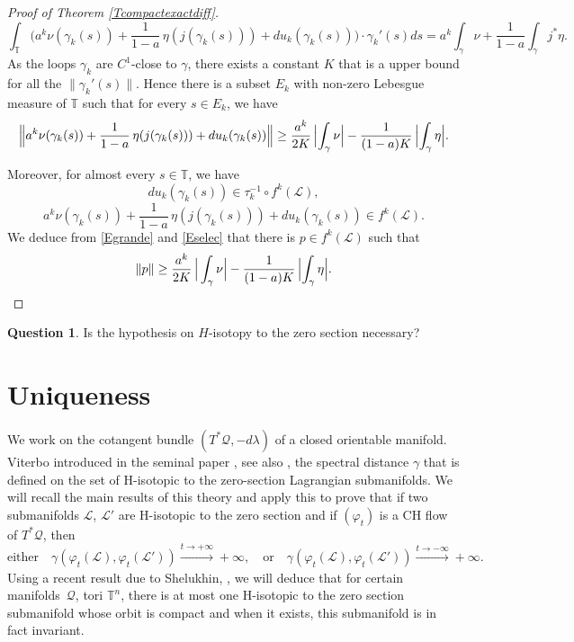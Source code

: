 \documentclass[JEP,XML,SOM,Unicode,published]{cedram}
\theoremstyle{definition}
\newtheorem*{question*}{Question}
\def\T{\mathbb{T}}
\def\cL{{\mathcal L}}
\def\cQ{{\mathcal Q}}
\begin{document}
\begin{proof}[Proof of Theorem \ref{Tcompactexactdiff}]
\[
\int_\T \Big( a^k\nu(\gamma_k(s))+\frac{1}{1-a}\,\eta(j(\gamma_k(s)))+du_k(\gamma_k(s))\Big)\cdot \gamma_k'(s)ds=a^k\int_\gamma\nu+\frac{1}{1-a}\int_\gamma j^*\eta.
\]
As the loops $\gamma_k$ are $C^1$-close to $\gamma$, there exists a constant $K$ that is a upper bound for all the $\| \gamma_k'(s)\|$. Hence there is a subset $E_k$ with non-zero Lebesgue measure of $\T$ such that for every $s\in E_k$, we have
\begin{equation}\label{Egrande}
\Bigl\|a^k\nu(\gamma_k(s))+\frac{1}{1-a}\,\eta(j(\gamma_k(s)))+du_k(\gamma_k(s))\Bigr\|\geq \frac{a^k}{2K}\,\Bigl\vert\int_\gamma\nu\Bigr\vert-\frac{1}{(1-a)K}\,\Bigl\vert\int_\gamma\eta\Bigr\vert.\end{equation}

Moreover, for almost every $s\in\T$, we have
\[
du_k(\gamma_k(s))\in \tau_{k}^{-1}\circ f^k(\cL),
\]
\ie
\begin{equation}\label{Eselec}
a^k\nu(\gamma_k(s))+\frac{1}{1-a}\,\eta(j(\gamma_k(s)))+du_k(\gamma_k(s))\in f^k(\cL).
\end{equation}
We deduce from \eqref{Egrande} and \eqref{Eselec} that there is $p\in f^k(\cL)$ such that
\[
\| p\|\geq \frac{a^k}{2K}\,\Big\vert\int_\gamma\nu\Big\vert-\frac{1}{(1-a)K}\,\Bigl\vert\int_\gamma\eta\Bigr\vert.\qedhere
\]
\end{proof}

\begin{question*}
Is the hypothesis on $H$-isotopy to the zero section necessary?
\end{question*}

\section{Uniqueness}\label{Suniqueness}

We work on the cotangent bundle $(T^*\cQ, -d\lambda)$ of a closed orientable manifold.
Viterbo introduced in the seminal paper \cite{Vit1992}, see also \cite{Vit2008}, the spectral distance $\gamma$ that is defined on the set of H-isotopic to the zero-section Lagrangian submanifolds.
We will recall the main results of this theory and apply this to prove that if two submanifolds $\cL$, $\cL'$ are H-isotopic to the zero section and if $(\varphi_t)$ is a CH flow of $T^*\cQ$, then
\[
\text{either}\quad\gamma (\varphi_t(\cL), \varphi_t(\cL'))\xrightarrow[]{t\to +\infty}+\infty,\quad\text{or}\quad\gamma (\varphi_t(\cL), \varphi_t(\cL'))\xrightarrow[]{t\to -\infty}+\infty.
\]
Using a recent result due to Shelukhin, \cite{Shel2020}, we will deduce that for certain manifolds~$\cQ$, \eg tori $\T^n$, there is at most one H-isotopic to the zero section submanifold whose orbit is compact and when it exists, this submanifold is in fact invariant.
\end{document}
